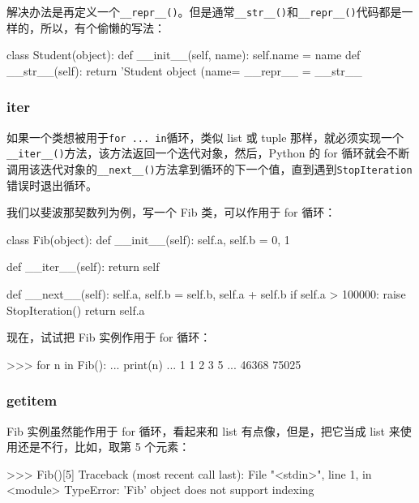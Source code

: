 解决办法是再定义一个\texttt{\_\_repr\_\_()}。但是通常\texttt{\_\_str\_\_()}和\texttt{\_\_repr\_\_()}代码都是一样的，所以，有个偷懒的写法：

\begin{pythoncode}
class Student(object):
    def __init__(self, name):
        self.name = name
    def __str__(self):
        return 'Student object (name=%
    __repr__ = __str__
\end{pythoncode}

\hypertarget{iter}{%
\subsubsection{\texorpdfstring{\textbf{iter}}{iter}}\label{iter}}

如果一个类想被用于\texttt{for\ ...\ in}循环，类似 list 或 tuple
那样，就必须实现一个\texttt{\_\_iter\_\_()}方法，该方法返回一个迭代对象，然后，Python
的 for
循环就会不断调用该迭代对象的\texttt{\_\_next\_\_()}方法拿到循环的下一个值，直到遇到\texttt{StopIteration}错误时退出循环。

我们以斐波那契数列为例，写一个 Fib 类，可以作用于 for 循环：

\begin{pythoncode}
class Fib(object):
    def __init__(self):
        self.a, self.b = 0, 1 

    def __iter__(self):
        return self 

    def __next__(self):
        self.a, self.b = self.b, self.a + self.b 
        if self.a > 100000: 
            raise StopIteration()
        return self.a 
\end{pythoncode}

现在，试试把 Fib 实例作用于 for 循环：

\begin{pythoncode}
>>> for n in Fib():
...     print(n)
...
1
1
2
3
5
...
46368
75025
\end{pythoncode}

\hypertarget{getitem}{%
\subsubsection{\texorpdfstring{\textbf{getitem}}{getitem}}\label{getitem}}

Fib 实例虽然能作用于 for 循环，看起来和 list 有点像，但是，把它当成 list
来使用还是不行，比如，取第 5 个元素：

\begin{pythoncode}
>>> Fib()[5]
Traceback (most recent call last):
  File "<stdin>", line 1, in <module>
TypeError: 'Fib' object does not support indexing
\end{pythoncode}

